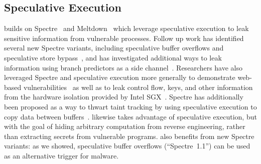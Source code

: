\subsection{Speculative Execution}


\speculake builds on Spectre~\cite{spectre} and Meltdown~\cite{meltdown} which
leverage speculative execution to leak sensitive information from vulnerable
processes.  Follow up work has identified several new Spectre variants,
including speculative buffer overflows and speculative store
bypass~\cite{kiriansky2018speculative,spec-store-bypass}, and has investigated
additional ways to leak information using branch
predictors as a side channel~\cite{evtyushkin2018branchscope}.
Researchers have also leveraged Spectre and speculative execution more generally
to demonstrate web-based
vulnerabilities~\cite{genkin2018drive,schwarz2018netspectre} as well as to leak
control flow, keys, and other information from the hardware isolation provided by Intel
SGX~\cite{spectre_sgx,chen2018sgxpectre,foreshadow,lee2017inferring}.
Spectre has additionally been proposed as a way to thwart taint tracking by using speculative
execution to copy data between buffers~\cite{necessaryBlog}.
\speculake likewise takes advantage of speculative execution, but with the goal
of hiding arbitrary computation from reverse engineering, rather than extracting
secrets from vulnerable programs. \speculake also benefits from
new Spectre variants: as we showed, speculative buffer overflows (``Spectre~1.1'')
can be used as an alternative trigger for malware.


